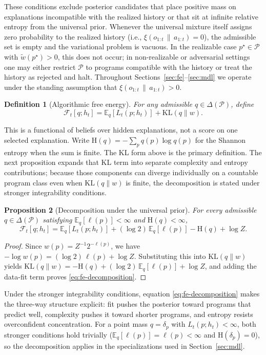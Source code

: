 \documentclass[11pt]{article}
\newtheorem{definition}{Definition}[section]
\newtheorem{proposition}[definition]{Proposition}
\theoremstyle{remark}
\newcommand{\Pcal}{\mathcal{P}}
\newcommand{\Fcal}{\mathcal{F}}
\newcommand{\E}{\mathbb{E}}
\newcommand{\KL}{\mathrm{KL}}
\newcommand{\Hh}{\mathrm{H}}
\newcommand{\givena}{\,\|\,}
\newcommand{\ellp}{\ell}
\newcommand{\wt}{\widetilde}
\begin{document}
These conditions exclude posterior candidates that place positive mass on explanations incompatible with the realized history or that sit at infinite relative entropy from the universal prior. Whenever the universal mixture itself assigns zero probability to the realized history (i.e., \(\xi(o_{1:t}\givena a_{1:t})=0\)), the admissible set is empty and the variational problem is vacuous. In the realizable case \(p^\star \in \Pcal\) with \(\wt w(p^\star) > 0\), this does not occur; in non-realizable or adversarial settings one may either restrict \(\Pcal\) to programs compatible with the history or treat the history as rejected and halt. Throughout Sections~\ref{sec:fe}--\ref{sec:mdl} we operate under the standing assumption that \(\xi(o_{1:t}\givena a_{1:t}) > 0\).

\begin{definition}[Algorithmic free energy]
For any admissible \(q \in \Delta(\Pcal)\), define
\[
\Fcal_t[q;h_t] = \E_q[L_t(p;h_t)] + \KL(q \| w).
\]
\end{definition}

This is a functional of beliefs over hidden explanations, not a score on one selected explanation. Write \(\Hh(q) = -\sum_p q(p)\log q(p)\) for the Shannon entropy when the sum is finite. The KL form above is the primary definition. The next proposition expands that KL term into separate complexity and entropy contributions; because those components can diverge individually on a countable program class even when \(\KL(q\|w)\) is finite, the decomposition is stated under stronger integrability conditions.

\begin{proposition}[Decomposition under the universal prior]
For every admissible \(q \in \Delta(\Pcal)\) satisfying \(\E_q[\ellp(p)] < \infty\) and \(\Hh(q) < \infty\),
\begin{equation}
\Fcal_t[q;h_t]
= \E_q[L_t(p;h_t)]
+ (\log 2)\,\E_q[\ellp(p)]
- \Hh(q)
+ \log Z.
\label{eq:fe-decomposition}
\end{equation}
\end{proposition}

\begin{proof}
Since \(w(p)=Z^{-1}2^{-\ellp(p)}\), we have \(-\log w(p) = (\log 2)\,\ellp(p) + \log Z\). Substituting this into \(\KL(q\|w)\) yields \(\KL(q\|w) = -\Hh(q) + (\log 2)\,\E_q[\ellp(p)] + \log Z\), and adding the data-fit term proves \eqref{eq:fe-decomposition}.
\end{proof}

Under the stronger integrability conditions, equation \eqref{eq:fe-decomposition} makes the three-way structure explicit: fit pushes the posterior toward programs that predict well, complexity pushes it toward shorter programs, and entropy resists overconfident concentration. For a point mass \(q = \delta_p\) with \(L_t(p;h_t) < \infty\), both stronger conditions hold trivially (\(\E_q[\ellp(p)]=\ellp(p)<\infty\) and \(\Hh(\delta_p)=0\)), so the decomposition applies in the specializations used in Section~\ref{sec:mdl}.
\end{document}
